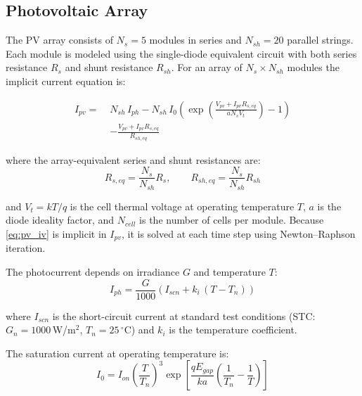 \documentclass[journal]{IEEEtran}
\begin{document}
\subsection{Photovoltaic Array}
\label{subsec:pv}

The PV array consists of $N_s = 5$ modules in series and $N_{sh} = 20$
parallel strings. Each module is modeled using the single-diode equivalent
circuit with both series resistance $R_s$ and shunt resistance $R_{sh}$.
For an array of $N_s \times N_{sh}$ modules the implicit current equation is:

\begin{equation}
\begin{split}
I_{pv} = \; & N_{sh}\,I_{ph} - N_{sh}\,I_0\!\left(
               \exp\!\left(\frac{V_{pv}+I_{pv}R_{s,eq}}{aN_sV_t}\right)-1
             \right) \\
           &- \frac{V_{pv}+I_{pv}R_{s,eq}}{R_{sh,eq}}
\end{split}
\label{eq:pv_iv}
\end{equation}

where the array-equivalent series and shunt resistances are:
\begin{equation}
R_{s,eq} = \frac{N_s}{N_{sh}}R_s, \qquad
R_{sh,eq} = \frac{N_s}{N_{sh}}R_{sh}
\label{eq:pv_req}
\end{equation}

and $V_t = kT/q$ is the cell thermal voltage at operating temperature $T$,
$a$ is the diode ideality factor, and $N_{cell}$ is the number of cells per
module. Because \eqref{eq:pv_iv} is implicit in $I_{pv}$, it is solved at
each time step using Newton--Raphson iteration.

The photocurrent depends on irradiance $G$ and temperature $T$:
\begin{equation}
I_{ph} = \frac{G}{1000}\!\left(I_{scn} + k_i\,(T - T_n)\right)
\label{eq:pv_iph}
\end{equation}

where $I_{scn}$ is the short-circuit current at standard test conditions
(STC: $G_n = 1000$\,W/m$^2$, $T_n = 25\,^\circ$C) and $k_i$ is the
temperature coefficient.

The saturation current at operating temperature is:
\begin{equation}
I_0 = I_{on}\!\left(\frac{T}{T_n}\right)^{\!3}
      \exp\!\left[\frac{qE_{gap}}{ka}\!\left(\frac{1}{T_n}-\frac{1}{T}\right)\right]
\label{eq:pv_io}
\end{equation}
\end{document}
